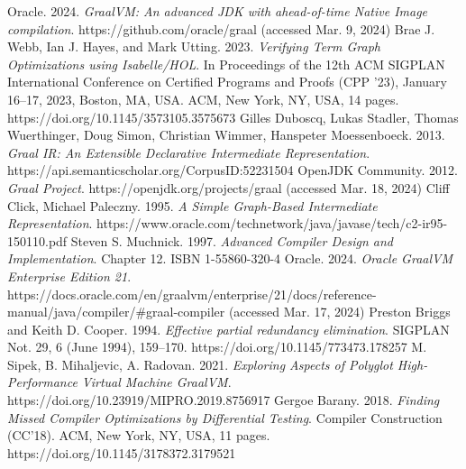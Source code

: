 \documentclass[12pt,openany,a4paper]{book}
\begin{document}



\cleardoublepage

\begin{thebibliography}{99}
 Oracle. 2024. \emph{GraalVM: An advanced JDK with ahead-of-time Native Image compilation}. https://github.com/oracle/graal (accessed Mar. 9, 2024)
 Brae J. Webb, Ian J. Hayes, and Mark Utting. 2023. \emph{Verifying Term Graph Optimizations using Isabelle/HOL}. In Proceedings of the 12th ACM SIGPLAN International Conference on Certified Programs and Proofs (CPP ’23), January 16–17, 2023, Boston, MA, USA. ACM, New York, NY, USA, 14 pages. https://doi.org/10.1145/3573105.3575673
 Gilles Duboscq, Lukas Stadler, Thomas Wuerthinger, Doug Simon, Christian Wimmer, Hanspeter Moessenboeck. 2013. \emph{Graal IR: An Extensible Declarative Intermediate Representation}. https://api.semanticscholar.org/CorpusID:52231504
 OpenJDK Community. 2012. \emph{Graal Project}. https://openjdk.org/projects/graal (accessed Mar. 18, 2024)
 Cliff Click, Michael Paleczny. 1995. \emph{A Simple Graph-Based Intermediate Representation}. https://www.oracle.com/technetwork/java/javase/tech/c2-ir95-150110.pdf
 Steven S. Muchnick. 1997. \emph{Advanced Compiler Design and Implementation}. Chapter 12. ISBN 1-55860-320-4
 Oracle. 2024. \emph{Oracle GraalVM Enterprise Edition 21}. https://docs.oracle.com/en/graalvm/enterprise/21/docs/reference-manual/java/compiler/\#graal-compiler (accessed Mar. 17, 2024)
 Preston Briggs and Keith D. Cooper. 1994. \emph{Effective partial redundancy elimination}. SIGPLAN Not. 29, 6 (June 1994), 159–170. https://doi.org/10.1145/773473.178257
 M. Sipek, B. Mihaljevic, A. Radovan. 2021. \emph{Exploring Aspects of Polyglot High-Performance Virtual Machine GraalVM}. https://doi.org/10.23919/MIPRO.2019.8756917
 Gergoe Barany. 2018. \emph{Finding Missed Compiler Optimizations by Differential Testing}. Compiler Construction (CC’18). ACM, New York, NY, USA, 11 pages. https://doi.org/10.1145/3178372.3179521

\end{thebibliography}
\end{document}
